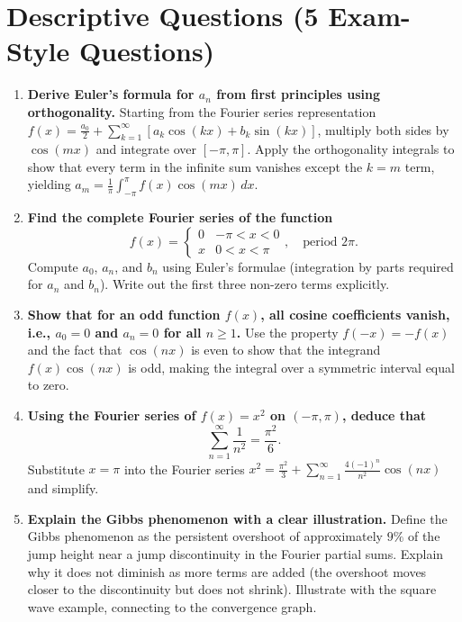 \documentclass[12pt,a4paper]{article}
\begin{document}
\section{Descriptive Questions (5 Exam-Style Questions)}

\begin{enumerate}[label=\textbf{D\arabic*.}]

\item \textbf{Derive Euler's formula for $a_n$ from first principles using orthogonality.}
Starting from the Fourier series representation $f(x) = \frac{a_0}{2} + \sum_{k=1}^{\infty}[a_k\cos(kx) + b_k\sin(kx)]$, multiply both sides by $\cos(mx)$ and integrate over $[-\pi, \pi]$.
Apply the orthogonality integrals to show that every term in the infinite sum vanishes except the $k = m$ term, yielding $a_m = \frac{1}{\pi}\int_{-\pi}^{\pi}f(x)\cos(mx)\,dx$.

\item \textbf{Find the complete Fourier series of the function}
\[
f(x) = \begin{cases} 0 & -\pi < x < 0 \\ x & 0 < x < \pi \end{cases}, \quad \text{period } 2\pi.
\]
Compute $a_0$, $a_n$, and $b_n$ using Euler's formulae (integration by parts required for $a_n$ and $b_n$).
Write out the first three non-zero terms explicitly.

\item \textbf{Show that for an odd function $f(x)$, all cosine coefficients vanish, i.e., $a_0 = 0$ and $a_n = 0$ for all $n \ge 1$.}
Use the property $f(-x) = -f(x)$ and the fact that $\cos(nx)$ is even to show that the integrand $f(x)\cos(nx)$ is odd, making the integral over a symmetric interval equal to zero.

\item \textbf{Using the Fourier series of $f(x) = x^2$ on $(-\pi, \pi)$, deduce that}
\[
\sum_{n=1}^{\infty}\frac{1}{n^2} = \frac{\pi^2}{6}.
\]
Substitute $x = \pi$ into the Fourier series $x^2 = \frac{\pi^2}{3} + \sum_{n=1}^{\infty}\frac{4(-1)^n}{n^2}\cos(nx)$ and simplify.

\item \textbf{Explain the Gibbs phenomenon with a clear illustration.}
Define the Gibbs phenomenon as the persistent overshoot of approximately $9\%$ of the jump height near a jump discontinuity in the Fourier partial sums.
Explain why it does not diminish as more terms are added (the overshoot moves closer to the discontinuity but does not shrink).
Illustrate with the square wave example, connecting to the convergence graph.

\end{enumerate}
\end{document}
